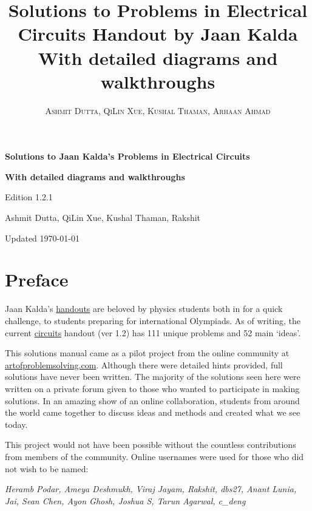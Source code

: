 \documentclass[11pt]{article}
\title{Solutions to Problems in Electrical Circuits Handout by Jaan Kalda With detailed diagrams and walkthroughs}
\author{\textsc{Ashmit Dutta, QiLin Xue, Kushal Thaman, Arhaan Ahmad}}
\begin{document}
\usetikzlibrary{calc}
\begin{titlepage}
    \begin{center}
        \vspace*{1cm}
 
        \Huge
        \textbf{Solutions to Jaan Kalda's Problems in Electrical Circuits}
 
        \vspace{0.5cm}
        \LARGE
        \textbf{With detailed diagrams and walkthroughs}
        
        \vspace{0.1cm}
        Edition 1.2.1
        
        \vspace{1.2cm}
 
         Ashmit Dutta, QiLin Xue, Kushal Thaman, Rakshit
        \vspace{10mm}
        \vfill
        
        \Large
        Updated
        \today
 
    \end{center}
\end{titlepage}
\newpage
\section*{Preface}
\vspace{-5mm}
\indent Jaan Kalda's \href{https://www.ioc.ee/~kalda/ipho/}{handouts} are beloved by physics students both in for a quick challenge, to students preparing for international Olympiads. As of writing, the current \href{https://www.ioc.ee/~kalda/ipho/electricity-circuits.pdf}{circuits} handout (ver 1.2) has 111 unique problems and 52 main `ideas'.

This solutions manual came as a pilot project from the online community at \url{artofproblemsolving.com}. Although there were detailed hints provided, full solutions have never been written. The majority of the solutions seen here were written on a private forum given to those who wanted to participate in making solutions. In an amazing show of an online collaboration, students from around the world came together to discuss ideas and methods and created what we see today.

This project would not have been possible without the countless contributions from members of the community. Online usernames were used for those who did not wish to be named: 

\textit{Heramb Podar, Ameya Deshmukh, Viraj Jayam, Rakshit, dbs27, Anant Lunia, Jai, Sean Chen, Ayon Ghosh, Joshua S, Tarun Agarwal, c\_deng}
\end{document}
